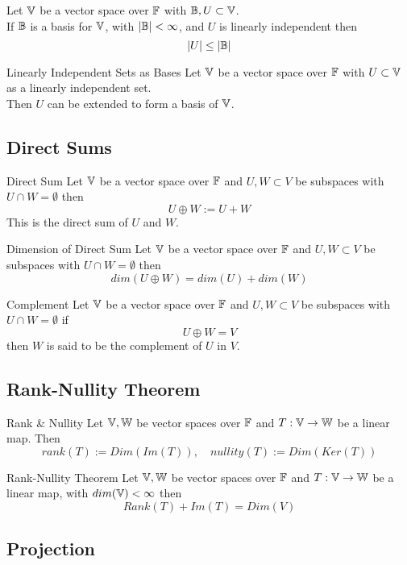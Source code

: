 \documentclass[11pt,a4paper]{article}
\begin{document}
\subtitle{Theorem 7.14}{}
Let $\mathbb{V}$ be a vector space over $\mathbb{F}$ with $\mathbb{B}, U \subset \mathbb{V}$.\\
If $\mathbb{B}$ is a basis for $\mathbb{V}$, with $|\mathbb{B}| < \infty$, and $U$ is linearly independent then $$|U| \leq |\mathbb{B}|$$

\subtitle{Theorem 7.15 - }{Linearly Independent Sets as Bases}
Let $\mathbb{V}$ be a vector space over $\mathbb{F}$ with $U \subset \mathbb{V}$ as a linearly independent set.\\
Then $U$ can be extended to form a basis of $\mathbb{V}$.

\subsection{Direct Sums}

\subtitle{Definition 7.16 - }{Direct Sum}
Let $\mathbb{V}$ be a vector space over $\mathbb{F}$ and $U, W \subset V$ be subspaces with $U \cap W = \emptyset$ then
$$U \oplus W := U + W$$
This is the direct sum of $U$ and $W$.\\

\subtitle{Theorem 7.17 - }{Dimension of Direct Sum}
Let $\mathbb{V}$ be a vector space over $\mathbb{F}$ and $U, W \subset V$ be subspaces with $U \cap W = \emptyset$ then
$$dim(U \oplus W) = dim(U) + dim(W)$$

\subtitle{Theorem 7.18 - }{Complement}
Let $\mathbb{V}$ be a vector space over $\mathbb{F}$ and $U, W \subset V$ be subspaces with $U \cap W = \emptyset$ if
$$U \oplus W = V$$
then $W$ is said to be the complement of $U$ in $V$.

\subsection{Rank-Nullity Theorem}

\subtitle{Definition 7.19 - }{Rank \& Nullity}
Let $\mathbb{V}, \mathbb{W}$ be vector spaces over $\mathbb{F}$ and $T : \mathbb{V} \to \mathbb{W}$ be a linear map. Then
$$rank(T) := Dim(Im(T)),\quad nullity(T) := Dim(Ker(T))$$

\subtitle{Theorem 7.20 - }{Rank-Nullity Theorem}
Let $\mathbb{V}, \mathbb{W}$ be vector spaces over $\mathbb{F}$ and $T : \mathbb{V} \to \mathbb{W}$ be a linear map, with $dim(\mathbb{V}) < \infty$ then
$$Rank(T) + Im(T) = Dim(V)$$

\subsection{Projection}
\end{document}
